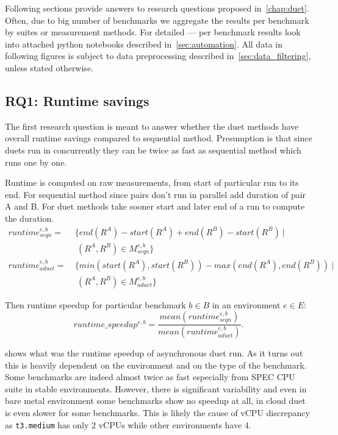 Following sections provide answers to research questions proposed in~\cref{chap:duet}.
Often, due to big number of benchmarks we aggregate the results per benchmark by suites or measurement methods.
For detailed --- per benchmark results look into attached python notebooks described in~\cref{sec:automation}.
All data in following figures is subject to data preprocessing described in~\cref{sec:data_filtering}, unless stated otherwise.

\subsection{RQ1: Runtime savings}
\label{sec:rq1}

The first research question is meant to answer whether the duet methods have overall runtime savings compared to sequential method.
Presumption is that since duets run in concurrently they can be twice as fast as sequential method which runs one by one.

Runtime is computed on raw measurements, from start of particular run to its end. For sequential method since pairs don't run in parallel add duration of pair A and B.
For duet methods take sooner start and later end of a run to compute the duration.
\begin{align*}
runtime^{e, b}_{seqn}  =&~\{end(R^A) - start(R^A) + end(R^B) - start(R^B)~|\\
                        &~~(R^A, R^B) \in M^{e, b}_{seqn}\} \\
runtime^{e, b}_{aduet} =&~\{min(start(R^A), start(R^B)) - max(end(R^A), end(R^B))~|\\
                        &~~(R^A, R^B) \in M^{e, b}_{aduet}\}
\end{align*}

Then runtime speedup for particular benchmark $b \in B$ in an environment $e \in E$:
\begin{equation}\label{eq:runtimespeedup}
runtime\_speedup^{e, b} = \frac{mean(runtime^{e, b}_{seqn})}{mean(runtime^{e, b}_{aduet})}.
\end{equation}

 shows what was the runtime speedup of asynchronous duet run.
As it turns out this is heavily dependent on the environment and on the type of the benchmark.
Some benchmarks are indeed almost twice as fast especially from SPEC CPU suite in stable environments.
However, there is significant variability and even in bare metal environment some benchmarks show no speedup at all, in cloud duet is even slower for some benchmarks.
This is likely the cause of vCPU discrepancy as \lstinline{t3.medium} has only $2$ vCPUs while other environments have $4$.

